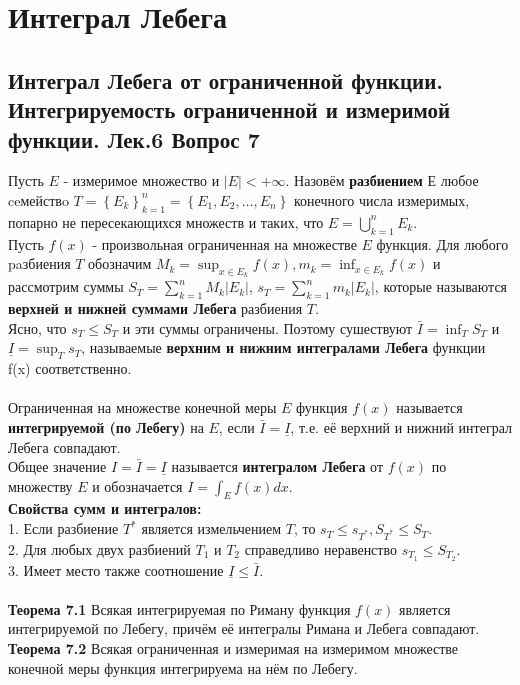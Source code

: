 \documentclass{article}
\begin{document}
\section{Интеграл Лебега}
\subsection{Интеграл Лебега от ограниченной функции. Интегрируемость ограниченной и измеримой функции. Лек.6 \textbf{Вопрос 7}}
	Пусть $E$ - измеримое множество и $|E|<+\infty$. Назовём \textbf{разбиением} $Е$ любое ceмействo  $T=\left\{E_{k}\right\}_{k=1}^{n}=\left\{E_{1}, E_{2}, \ldots, E_{n}\right\}$ конечного числа измеримых, попарно не
	пересекающихся множеств и таких, что $E=\bigcup_{k=1}^{n} E_{k}$.\\
	Пусть $f(x)$ - произвольная ограниченная на множестве $E$ функция. Для любого paзбиения $T$ обозначим $M_{k}=\sup _{x \in E_{k}} f(x), m_{k}=\inf _{x \in E_{k}} f(x)$ и рассмотрим суммы $S_{T}=\sum_{k=1}^{n} M_{k}\left|E_{k}\right|$, $s_{T}=\sum_{k=1}^{n} m_{k}\left|E_{k}\right|$,  которые называются \textbf{верхней и нижней суммами Лебега} разбиения $T$.\\ Ясно, что $s_{T}\leq S_{T}$ и эти суммы ограничены. Поэтому сушествуют  $\bar{I}=\inf _{T} S_{T}$ и $\underline{I}=\sup _{T} s_{T}$, называемые \textbf{верхним и нижним интегралами Лебега} функции f(x) соответственно.\\
	\\
	Ограниченная на множестве конечной меры $E$ функция $f(x)$
	называется \textbf{интегрируемой (по Лебегу)} на $E$, если $\bar{I}=\underline{I}$, т.е. её верхний и нижний интеграл Лебега совпадают.\\
	Общее значение $I=\bar{I}=\underline{I}$ называется \textbf{интегралом Лебега} от $f(x)$ по множеству $E$ и обозначается $I=\int_{E} f(x)dx$.\\
	
	\textbf{Свойства сумм и интегралов:}\\
	1. Если разбиение ${T}^{*}$ является измельчением $T$, то ${s}_{T}\le {s}_{{T}^{*}}, {S}_{{T}^{*}}\le {S}_{T}$.\\
	2. Для любых двух разбиений ${T}_{1}$ и ${T}_{2}$ справедливо неравенство ${s}_{{T}_{1}}\le {S}_{{T}_{2}}$.\\
	3. Имеет место также соотношение $\underline{I}\le \bar{I}$.\\
	\\
	\textbf{Теорема 7.1} Всякая интегрируемая по Риману функция $f(x)$ является
	интегрируемой по Лебегу, причём её интегралы Римана и Лебега совпадают.\\
	\textbf{Теорема 7.2} Всякая ограниченная и измеримая на измеримом множестве конечной меры функция интегрируема на нём по Лебегу.\\
\end{document}
